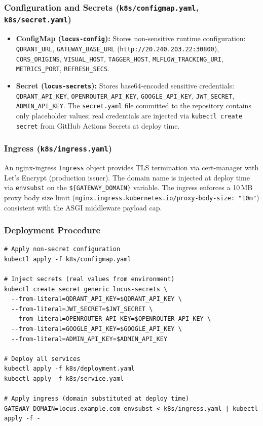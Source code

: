 \documentclass[12pt]{article}
\begin{document}
\subsubsection{Configuration and Secrets (\texttt{k8s/configmap.yaml}, \texttt{k8s/secret.yaml})}
\label{sec:secrets}

\begin{itemize}[leftmargin=*]
  \item \textbf{ConfigMap (\texttt{locus-config}):} Stores non-sensitive runtime configuration: \texttt{QDRANT\_URL}, \texttt{GATEWAY\_BASE\_URL} (\texttt{http://20.240.203.22:30800}), \texttt{CORS\_ORIGINS}, \texttt{VISUAL\_HOST}, \texttt{TAGGER\_HOST}, \texttt{MLFLOW\_TRACKING\_URI}, \texttt{METRICS\_PORT}, \texttt{REFRESH\_SECS}.
  \item \textbf{Secret (\texttt{locus-secrets}):} Stores base64-encoded sensitive credentials: \texttt{QDRANT\_API\_KEY}, \texttt{OPENROUTER\_API\_KEY}, \texttt{GOOGLE\_API\_KEY}, \texttt{JWT\_SECRET}, \texttt{ADMIN\_API\_KEY}. The \texttt{secret.yaml} file committed to the repository contains only placeholder values; real credentials are injected via \texttt{kubectl create secret} from GitHub Actions Secrets at deploy time.
\end{itemize}

\subsubsection{Ingress (\texttt{k8s/ingress.yaml})}

An nginx-ingress \texttt{Ingress} object provides TLS termination via cert-manager with Let's Encrypt (production issuer). The domain name is injected at deploy time via \texttt{envsubst} on the \texttt{\$\{GATEWAY\_DOMAIN\}} variable. The ingress enforces a 10\,MB proxy body size limit (\texttt{nginx.ingress.kubernetes.io/proxy-body-size: "10m"}) consistent with the ASGI middleware payload cap.

\subsubsection{Deployment Procedure}

\begin{lstlisting}[caption={Kubernetes deployment commands on Azure Standard\_B2s}]
# Apply non-secret configuration
kubectl apply -f k8s/configmap.yaml

# Inject secrets (real values from environment)
kubectl create secret generic locus-secrets \
  --from-literal=QDRANT_API_KEY=$QDRANT_API_KEY \
  --from-literal=JWT_SECRET=$JWT_SECRET \
  --from-literal=OPENROUTER_API_KEY=$OPENROUTER_API_KEY \
  --from-literal=GOOGLE_API_KEY=$GOOGLE_API_KEY \
  --from-literal=ADMIN_API_KEY=$ADMIN_API_KEY

# Deploy all services
kubectl apply -f k8s/deployment.yaml
kubectl apply -f k8s/service.yaml

# Apply ingress (domain substituted at deploy time)
GATEWAY_DOMAIN=locus.example.com envsubst < k8s/ingress.yaml | kubectl apply -f -
\end{lstlisting}
\end{document}
